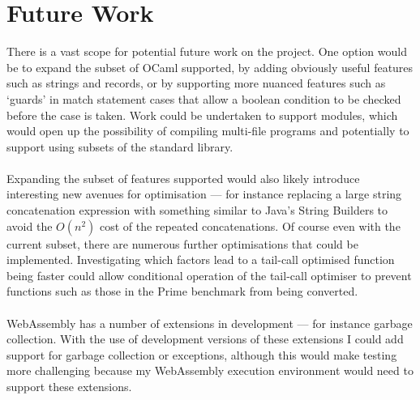 \documentclass[12pt,twoside,notitlepage]{report}
\begin{document}
\section{Future Work}
There is a vast scope for potential future work on the project. One option would be to expand the subset of OCaml supported, by adding obviously useful features such as strings and records, or by supporting more nuanced features such as `guards' in match statement cases that allow a boolean condition to be checked before the case is taken. Work could be undertaken to support modules, which would open up the possibility of compiling multi-file programs and potentially to support using subsets of the standard library.
\\\\
Expanding the subset of features supported would also likely introduce interesting new avenues for optimisation --- for instance replacing a large string concatenation expression with something similar to Java's String Builders to avoid the $O(n^2)$ cost of the repeated concatenations. Of course even with the current subset, there are numerous further optimisations that could be implemented. Investigating which factors lead to a tail-call optimised function being faster could allow conditional operation of the tail-call optimiser to prevent functions such as those in the Prime benchmark from being converted.
\\\\
WebAssembly has a number of extensions in development --- for instance garbage collection. With the use of development versions of these extensions I could add support for garbage collection or exceptions, although this would make testing more challenging because my WebAssembly execution environment would need to support these extensions.


\clearpage


\printbibliography[title={Bibliography}]
\clearpage

\appendix
\end{document}
